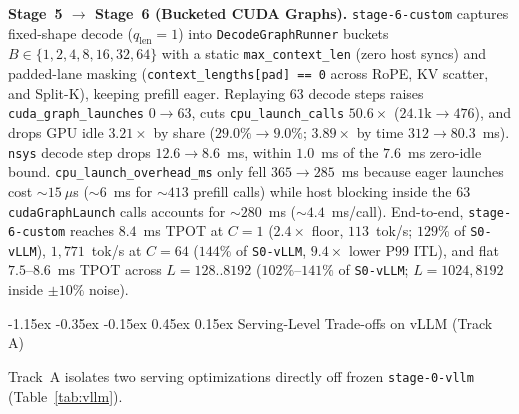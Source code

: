 \documentclass[10pt,twocolumn]{article}
\makeatletter
\renewcommand\section{\@startsection{section}{1}{\z@}%
  {-1.15ex \@plus -0.35ex \@minus -0.15ex}%
  {0.45ex \@plus 0.15ex}%
  {\normalfont\large\bfseries}}
\newcommand{\code}[1]{\texttt{\small #1}}
\newcommand{\stage}[1]{\texttt{\footnotesize #1}}
\makeatother
\begin{document}
\textbf{Stage~5 $\rightarrow$ Stage~6 (Bucketed CUDA Graphs).}
\stage{stage-6-custom} captures fixed-shape decode ($q_{\text{len}}{=}1$) into \code{DecodeGraphRunner} buckets $B \in \{1,2,4,8,16,32,64\}$ with a static \code{max\_context\_len} (zero host syncs) and padded-lane masking (\code{context\_lengths[pad] == 0} across RoPE, KV scatter, and Split-K), keeping prefill eager. Replaying 63 decode steps raises \code{cuda\_graph\_launches} $0 \rightarrow 63$, cuts \code{cpu\_launch\_calls} $50.6\times$ ($24.1\text{k} \rightarrow 476$), and drops GPU idle $3.21\times$ by share ($29.0\% \rightarrow 9.0\%$; $3.89\times$ by time $312 \rightarrow 80.3$~ms). \code{nsys} decode step drops $12.6 \rightarrow 8.6$~ms, within $1.0$~ms of the $7.6$~ms zero-idle bound. \code{cpu\_launch\_overhead\_ms} only fell $365 \rightarrow 285$~ms because eager launches cost $\sim 15~\mu$s ($\sim 6$~ms for $\sim 413$ prefill calls) while host blocking inside the 63 \code{cudaGraphLaunch} calls accounts for $\sim 280$~ms ($\sim 4.4$~ms/call). End-to-end, \stage{stage-6-custom} reaches $8.4$~ms TPOT at $C{=}1$ ($2.4\times$ floor, $113$~tok/s; $129\%$ of \stage{S0-vLLM}), $1{,}771$~tok/s at $C{=}64$ ($144\%$ of \stage{S0-vLLM}, $9.4\times$ lower P99 ITL), and flat $7.5$--$8.6$~ms TPOT across $L{=}128..8192$ ($102\%$--$141\%$ of \stage{S0-vLLM}; $L{=}1024, 8192$ inside $\pm 10\%$ noise).

\section{Serving-Level Trade-offs on vLLM (Track A)}

Track~A isolates two serving optimizations directly off frozen \stage{stage-0-vllm} (Table~\ref{tab:vllm}).
\end{document}
